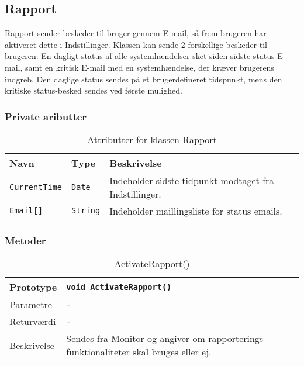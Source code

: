 \subsection{Rapport}

Rapport sender beskeder til bruger gennem E-mail, så frem brugeren har aktiveret dette i Indstillinger. Klassen kan sende 2 forskellige beskeder til brugeren: En dagligt status af alle systemhændelser sket siden sidste status E-mail, samt en kritisk E-mail med en systemhændelse, der kræver brugerens indgreb. Den daglige status sendes på et brugerdefineret tidspunkt, mens den kritiske status-besked sendes ved første mulighed.

\subsubsection{Private aributter}

\begin{table}[h]
\begin{tabularx}{\textwidth}{| L{2.5cm} | l | Z |} \hline
Navn & Type & Beskrivelse \\\hline
\texttt{CurrentTime} & \texttt{Date} & Indeholder sidste tidpunkt modtaget fra Indstillinger. \\\hline
\texttt{Email[]} & \texttt{String} & Indeholder maillingsliste for status emails. \\\hline
\end{tabularx}
\caption{Attributter for klassen Rapport}
\label{table:Rapport_attributter}
\end{table}

\subsubsection{Metoder}

\begin{table}[h]
\begin{tabularx}{\textwidth}{| >{\raggedright\arraybackslash}p{2.5 cm} | >{\raggedright\arraybackslash}X |} \hline
Prototype & \texttt{void ActivateRapport()} \\\hline
Parametre & \texttt{-} \\\hline
Returværdi & \texttt{-} \\\hline
Beskrivelse & Sendes fra Monitor og angiver om rapporterings funktionaliteter skal bruges eller ej.
 \\\hline
\end{tabularx}
\caption{ActivateRapport()}
\label{table:Rapport_ActivateRapport}
\end{table}

